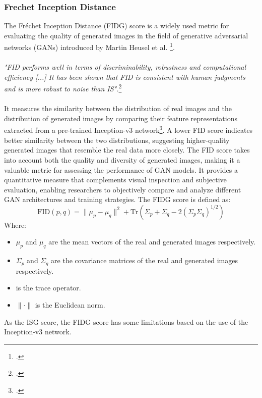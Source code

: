 \subsubsection{Frechet Inception Distance}
\label{subsubsec:frechet-inception-distance}
The Fréchet Inception Distance (\gls{FIDG}\glsfirstoccur) score is a widely used metric for evaluating the quality of generated images in the field of generative adversarial networks (GANs) introduced by Martin Heusel et al. \footcite{paper:heusel2017gans}. 
\\\\
\emph{"FID performs well in terms of discriminability, robustness and computational efficiency [...] It has been shown that FID is consistent with human judgments and is more robust to noise than IS".}\footcite{paper:ganeval}\\\\
It measures the similarity between the distribution of real images and the distribution of generated images by comparing their feature representations extracted from a pre-trained Inception-v3 network\footcite{paper:inceptionv3}. 
A lower FID score indicates better similarity between the two distributions, suggesting higher-quality generated images that resemble the real data more closely. 
The FID score takes into account both the quality and diversity of generated images, making it a valuable metric for assessing the performance of GAN models. 
It provides a quantitative measure that complements visual inspection and subjective evaluation, enabling researchers to objectively compare and analyze different GAN architectures and training strategies.
The \gls{FIDG} score is defined as:
\begin{equation}
    \label{eq:fid-score}
    \text{FID}(p, q) = \|\mu_p - \mu_q\|^2 + \text{Tr}(\Sigma_p + \Sigma_q - 2(\Sigma_p\Sigma_q)^{1/2})
\end{equation}
Where:
\begin{itemize}
    \item $\mu_p$ and $\mu_q$ are the mean vectors of the real and generated images respectively.
    \item $\Sigma_p$ and $\Sigma_q$ are the covariance matrices of the real and generated images respectively.
    \item {} is the trace operator.
    \item $\|\cdot\|$ is the Euclidean norm.
\end{itemize}
As the \gls{ISG} score, the \gls{FIDG} score has some limitations based on the use of the Inception-v3 network.
